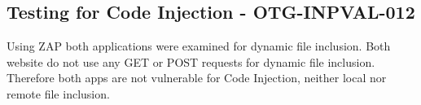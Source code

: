 \subsection{Testing for Code Injection - OTG-INPVAL-012}
Using ZAP both applications were examined for dynamic file inclusion. Both website do not use any GET or POST requests for dynamic file inclusion. Therefore both apps are not vulnerable for Code Injection, neither local nor remote file inclusion.
\clearpage